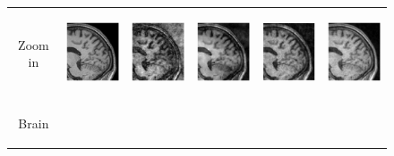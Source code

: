 \documentclass[review]{elsarticle}
\begin{document}
\begin{figure}[H]
\begin{raggedleft}
\begin{tabular}{cccccc}
			\tabularnewline
			
			\multirow{1}{0.05cm}[1.3cm]{\begin{turn}{90} {\footnotesize Zoom in} \end{turn}} &
			
			\includegraphics[width=2.5cm,height=2.5cm]{include/grp2/factor6/022-Guys-0701-T1/022-Guys-0701-T1_images__zoom_50} &
			\includegraphics[width=2.5cm,height=2.5cm]{include/grp2/factor6/022-Guys-0701-T1/022-Guys-0701-T1_images__zeroPadding_zoom_50} & 
			\includegraphics[width=2.5cm,height=2.5cm]{include/grp2/factor6/022-Guys-0701-T1/022-Guys-0701-T1_images__CS_zoom_50} & \includegraphics[width=2.5cm,height=2.5cm]{include/grp2/factor6/022-Guys-0701-T1/022-Guys-0701-T1_images__IMCNNL2TUNE_zoom_50} & \includegraphics[width=2.5cm,height=2.5cm]{include/grp2/factor6/022-Guys-0701-T1/022-Guys-0701-T1_images__predict_zoom_50}
			
			\tabularnewline
			
			\multirow{2}{0.05cm}[1.4cm]{\begin{turn}{90} {\footnotesize Brain} \end{turn}} & 
			

\end{tabular}
\end{raggedleft}
\end{figure}
\end{document}
